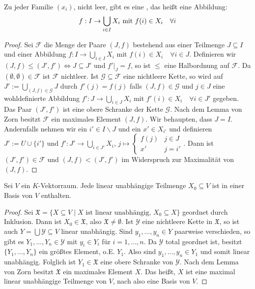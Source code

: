 \begin{conclusion}[Auswahlaxiom]
	Zu jeder Familie $(x_i)$, nicht leer, gibt es eine , das heißt eine Abbildung:
	\begin{align}
		f: I\to \bigcup_{i\in I} X_i\text{ mit } f(i)\in X_i\quad\forall i\notag
	\end{align}
\end{conclusion}
\begin{proof}
	Sei $\mathcal{F}$ die Menge der Paare $(J,f)$ bestehend aus einer Teilmenge $J\subseteq I$ und einer Abbildung $f:I\to \bigcup_{i\in I} X_i$ mit $f(i)\in X_i\quad\forall i\in J$. Definieren wir $(J,f)\le (J',f')\iff J\subseteq J'$ und $f'\vert_J = f$, so ist $\le$ eine Halbordnung auf $\mathcal{F}$. Da $(\emptyset,\emptyset)\in\mathcal{F}$ ist $\mathcal{F}$ nichtleer. Ist $\mathcal{G}\subseteq\mathcal{F}$ eine nichtleere Kette, so wird auf $J':=\bigcup_{(J,f)\in\mathcal{G}} J$ durch $f'(j)=f(j)$ falls $(J,f)\in\mathcal{G}$ und $j\in J$ eine wohldefinierte Abbildung $f':J\to \bigcup_{i\in J}X_i$ mit $f'(i)\in X_i\quad\forall i\in J'$ gegeben. Das Paar $(J',f')$ ist eine obere Schranke der Kette $\mathcal{G}$. Nach dem Lemma von Zorn besitzt $\mathcal{F}$ ein maximales Element $(J,f)$. Wir behaupten, dass $J=I$. Andernfalls nehmen wir ein $i'\in I\backslash J$ und ein $x'\in X_{i'}$ und definieren $J':= U\cup\{i'\}$ und $f':J'\to \bigcup_{i\in J'} X_i$, $j\mapsto\begin{cases}f(j)&j\in J\\ x'&j=i'\end{cases}$. Dann ist $(J',f')\in\mathcal{F}$ und $(J,f)<(J',f')$ im Widerspruch zur Maximalität von $(J,f)$.
\end{proof}


\begin{conclusion}[Basisergänzungssatz]
	Sei $V$ ein $K$-Vektorraum. Jede linear unabhängige Teilmenge $X_0\subseteq V$ ist in einer Basis von $V$ enthalten.
\end{conclusion}
\begin{proof}
	Sei $\mathfrak{X}=\{X\subseteq V\mid X\text{ ist linear unabhängig, } X_0\subseteq X\}$ geordnet durch Inklusion. Dann ist $X_0\in\mathfrak{X}$, also $\mathfrak{X}\neq\emptyset$. Ist $\mathcal{Y}$ eine nichtleere Kette in $\mathfrak{X}$, so ist auch $Y=\bigcup\mathcal{Y}\subseteq V$ linear unabhängig. Sind $y_1,...,y_n\in Y$ paarweise verschieden, so gibt es $Y_1,...,Y_n\in\mathcal{Y}$ mit $y_i\in Y_i$ für $i=1,...,n$. Da $\mathcal{Y}$ total geordnet ist, besitzt $\{Y_1,...,Y_n\}$ ein größtes Element, o.E. $Y_1$. Also sind $y_1,...,y_n\in Y_1$ und somit linear unabhängig. Folglich ist $Y_1\in \mathfrak{X}$ eine obere Schranke von $\mathcal{Y}$. Nach dem Lemma von Zorn besitzt $\mathfrak{X}$ ein maximales Element $X$. Das heißt, $X$ ist eine maximal linear unabhängige Teilmenge von $V$, nach  also eine Basis von $V$.
	\end{proof}